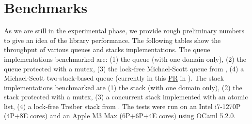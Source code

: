 \documentclass[a4paper, 11pt]{article}
\begin{document}
% 
\section{Benchmarks}\label{sec:benchmarks}



As we are still in the experimental phase, we provide rough preliminary numbers to give an idea of the library performance. The following tables show the throughput of various queues and stacks implementations. The queue implementations benchmarked are:
(1) the \Stdlib queue (with one domain only),
(2) the \Stdlib queue protected with a mutex,
(3) the lock-free Michael-Scott queue from \Saturn,
(4) a Michael-Scott two-stack-based queue (currently in this \href{https://github.com/ocaml-multicore/saturn/pull/112}{PR} in \Saturn).
The stack implementations benchmarked are
(1) the \Stdlib stack (with one domain only),
(2) the \Stdlib stack protected with a mutex,
(3) a concurrent stack implemented with an atomic list,
(4) a lock-free Treiber stack from \Saturn.
The tests were run on an Intel i7-1270P (4P+8E cores) and an Apple M3 Max (6P+6P+4E cores) using OCaml 5.2.0.
\end{document}
